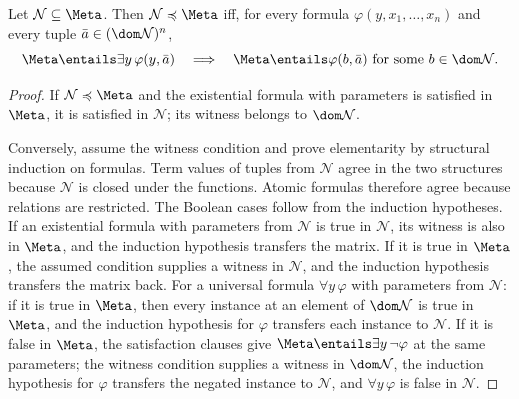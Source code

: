 \begin{theorem}
\label{thm:tarski-vaught-fol}
Let \(\mathcal N\subseteq\Meta\).  Then
\(\mathcal N\preccurlyeq\Meta\) iff, for every formula
\(\varphi(y,x_1,\ldots,x_n)\) and every tuple
\(\bar a\in(\dom\mathcal N)^{n}\),
\[
 \Meta\entails\exists y\,\varphi(y,\bar a)
 \quad\Longrightarrow\quad
 \Meta\entails\varphi(b,\bar a)
 \text{ for some }b\in\dom\mathcal N.
\]
\end{theorem}
\begin{proof}
If \(\mathcal N\preccurlyeq\Meta\) and the existential formula with
parameters is satisfied in \(\Meta\), it is satisfied in
\(\mathcal N\); its witness
belongs to \(\dom\mathcal N\).

Conversely, assume the witness condition and prove elementarity by structural
induction on formulas.  Term values of tuples from \(\mathcal N\) agree in
the two structures because \(\mathcal N\) is closed under the functions.
Atomic formulas therefore agree because relations are restricted.  The
Boolean cases follow from the induction hypotheses.  If an existential formula
with parameters from \(\mathcal N\) is true in \(\mathcal N\), its witness is
also in \(\Meta\), and the induction hypothesis transfers the matrix.  If it
is true in \(\Meta\), the assumed condition supplies a witness in
\(\mathcal N\), and the induction hypothesis transfers the matrix back.
For a universal formula \(\forall y\,\varphi\) with parameters from
\(\mathcal N\): if it is true in \(\Meta\), then every instance at an
element of \(\dom\mathcal N\) is true in \(\Meta\), and the induction
hypothesis for \(\varphi\) transfers each instance to \(\mathcal N\).  If
it is false in \(\Meta\), the satisfaction clauses give
\(\Meta\entails\exists y\,\neg\varphi\) at the same parameters; the
witness condition supplies a witness in \(\dom\mathcal N\), the
induction hypothesis for \(\varphi\) transfers the negated instance to
\(\mathcal N\), and \(\forall y\,\varphi\) is false in
\(\mathcal N\).
\end{proof}

